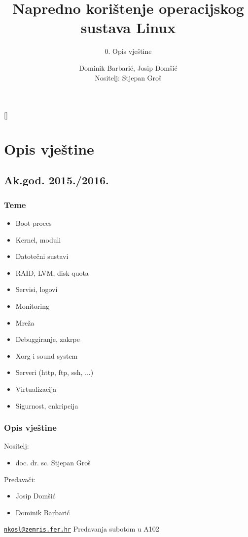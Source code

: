 \documentclass[t]{beamer}
\date{}
\title[NKOSL]{Napredno korištenje operacijskog sustava Linux}
\author[]{Dominik Barbarić, Josip Domšić\\{\small Nositelj: Stjepan Groš}}
\subtitle{0. Opis vještine}
\institute[]{Sveučilište u Zagrebu\\Fakultet elektrotehnike i računarstva}
\begin{document}
{
	\begin{frame}
		\maketitle
	\end{frame}
}

\section{Opis vještine}
\subsection{Ak.god. 2015./2016.}

\begin{frame}
	\frametitle{Teme}
	\begin{itemize}
		\item Boot proces
		\item Kernel, moduli
		\item Datotečni sustavi
		\item RAID, LVM, disk quota
		\item Servisi, logovi
		\item Monitoring
		\item Mreža
		\item Debuggiranje, zakrpe
		\item Xorg i sound system
		\item Serveri (http, ftp, ssh, ...)
		\item Virtualizacija
		\item Sigurnost, enkripcija
	\end{itemize}
\end{frame}

\begin{frame}
	\frametitle{Opis vještine}
	Nositelj:
	\begin{itemize}
		\item[] doc. dr. sc. Stjepan Groš
	\end{itemize}
	Predavači:
	\begin{itemize}
		\item Josip Domšić
		\item Dominik Barbarić
	\end{itemize}
	\vfill
	\href{mailto:nkosl@zemris.fer.hr}{\nolinkurl{nkosl@zemris.fer.hr}}
	\vfill
	Predavanja subotom u A102
\end{frame}
\end{document}
